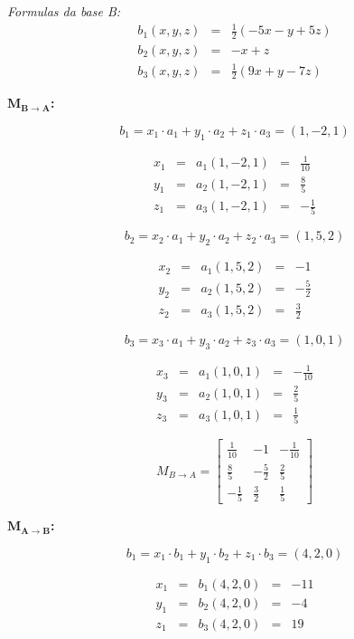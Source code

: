 \documentclass[11pt]{article}
\newenvironment{question}[1]
  {\par\addvspace{\medskipamount}
   \noindent\makebox[0pt][r]{\textbf{#1)} }\ignorespaces}
  {\par\addvspace{\medskipamount}}
\begin{document}
\begin{question}{1}
\bigskip
\textit{Formulas da base B:}
$$
\begin{array}{rcl}
    b_1(x,y,z) &= &\frac{1}{2}(-5x-y+5z)\\
    b_2(x,y,z) &= &-x+z\\
    b_3(x,y,z) &= &\frac{1}{2}(9x+y-7z)
\end{array}
$$

\newpage
\bigskip
\textbf{$\boldsymbol{M_{B \rightarrow A}}$:}

$$b_1 = x_1 \cdot a_1+y_1 \cdot a_2+z_1 \cdot a_3=(1,-2,1)$$

$$
\begin{array}{rcrcl}
    x_1 &= &a_1(1,-2,1) &= &\frac{1}{10}\\
    y_1 &= &a_2(1,-2,1) &= &\frac{8}{5}\\
    z_1 &= &a_3(1,-2,1) &= &-\frac{1}{5}
\end{array}
$$

$$b_2 = x_2 \cdot a_1+y_2 \cdot a_2+z_2 \cdot a_3=(1,5,2)$$

$$
\begin{array}{rcrcl}
    x_2 &= &a_1(1,5,2) &= &-1\\
    y_2 &= &a_2(1,5,2) &= &-\frac{5}{2}\\
    z_2 &= &a_3(1,5,2) &= &\frac{3}{2}
\end{array}
$$

$$b_3 = x_3 \cdot a_1+y_3 \cdot a_2+z_3 \cdot a_3=(1,0,1)$$

$$
\begin{array}{rcrcl}
    x_3 &= &a_1(1,0,1) &= &-\frac{1}{10}\\
    y_3 &= &a_2(1,0,1) &= &\frac{2}{5}\\
    z_3 &= &a_3(1,0,1) &= &\frac{1}{5}
\end{array}
$$

$$
M_{B \rightarrow A}=\left[\begin{array}{rrr}
    \frac{1}{10} &-1 &-\frac{1}{10}\\
    \frac{8}{5} &-\frac{5}{2} &\frac{2}{5}\\
    -\frac{1}{5} &\frac{3}{2} &\frac{1}{5}
\end{array}\right]
$$

\bigskip
\textbf{$\boldsymbol{M_{A \rightarrow B}}$:}

$$b_1 = x_1 \cdot b_1+y_1 \cdot b_2+z_1 \cdot b_3=(4,2,0)$$

$$
\begin{array}{rcrcl}
    x_1 &= &b_1(4,2,0) &= &-11\\
    y_1 &= &b_2(4,2,0) &= &-4\\
    z_1 &= &b_3(4,2,0) &= &19
\end{array}
$$


\end{question}
\end{document}
